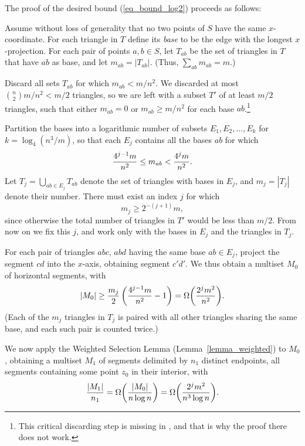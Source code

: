 \documentclass[11pt]{article}
\begin{document}
The proof of the desired bound (\ref{eq_bound_log2}) proceeds as
follows:

Assume without loss of generality that no two points of $S$ have the
same $x$-coordinate. For each triangle in $T$ define its \emph{base}
to be the edge with the longest $x$-projection. For each pair of
points $a, b\in S$, let $T_{ab}$ be the set of triangles in $T$ that
have $ab$ as base, and let $m_{ab} = |T_{ab}|$. (Thus, $\sum_{ab}
m_{ab} = m$.)

Discard all sets $T_{ab}$ for which $m_{ab} < m/n^2$. We discarded
at most ${n\choose 2} m/n^2 < m/2$ triangles, so we are left with a
subset $T'$ of at least $m/2$ triangles, such that either $m_{ab} =
0$ or $m_{ab} \ge m/n^2$ for each base $ab$.\footnote{This critical
discarding step is missing in \cite{eppstein}, and that is why the
proof there does not work.}

Partition the bases into a logarithmic number of subsets $E_1, E_2,
\ldots, E_k$ for $k = \log_4 (n^3/m)$, so that each $E_j$ contains
all the bases $ab$ for which
\begin{equation}\label{eq_bound_m_ab}
{4^{j-1} m \over n^2} \le m_{ab} < {4^j m \over n^2}.
\end{equation}
Let $T_j = \bigcup_{ab \in E_j} T_{ab}$ denote the set of triangles
with bases in $E_j$, and $m_j = |T_j|$ denote their number. There
must exist an index $j$ for which
\begin{equation*}
m_j \ge 2^{-(j+1)} m,
\end{equation*}
since otherwise the total number of triangles in $T'$ would be less
than $m/2$. From now on we fix this $j$, and work only with the
bases in $E_j$ and the triangles in $T_j$.

For each pair of triangles $abc$, $abd$ having the same base $ab \in
E_j$, project the segment $cd$ into the $x$-axis, obtaining segment
$c'd'$. We thus obtain a multiset $M_0$ of horizontal segments, with
\begin{equation*}
|M_0| \ge {m_j\over 2} \left( {4^{j-1} m \over n^2} - 1 \right) =
\Omega{\left({ 2^j m^2 \over n^2 }\right)}.
\end{equation*}
(Each of the $m_j$ triangles in $T_j$ is paired with all other
triangles sharing the same base, and each such pair is counted
twice.)

We now apply the Weighted Selection Lemma
(Lemma~\ref{lemma_weighted}) to $M_0$, obtaining a multiset $M_1$ of
segments delimited by $n_1$ distinct endpoints, all segments
containing some point $z_0$ in their interior, with
\begin{equation*}
{ |M_1| \over n_1} = \Omega{\left({ |M_0| \over n \log n }\right)} =
\Omega{\left({ 2^j m^2 \over n^3 \log n }\right)}.
\end{equation*}
\end{document}
